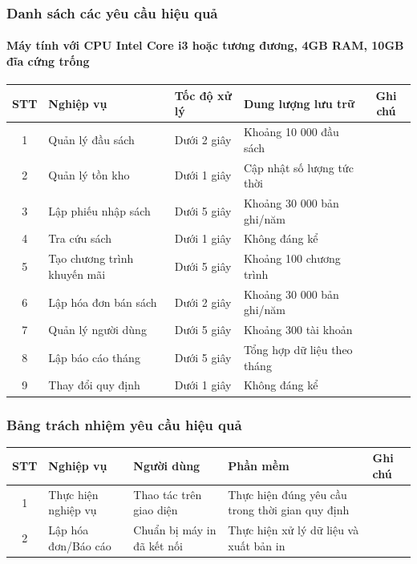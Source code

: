 \documentclass[12pt]{report}
\begin{document}
            \subsubsection{Danh sách các yêu cầu hiệu quả}
                \paragraph{Máy tính với CPU Intel Core i3 hoặc tương đương, 4GB RAM, 10GB đĩa cứng trống}
                \begin{tabularx}{\textwidth}{|c|>{\RaggedRight}X|l|l|c|}
                    \hline
                    \textbf{STT} & \textbf{Nghiệp vụ} & 
                    \textbf{Tốc độ xử lý} & \textbf{Dung lượng lưu trữ} & \textbf{Ghi chú} \\ \hline
                    1 & Quản lý đầu sách & Dưới 2 giây & Khoảng 10 000 đầu sách & \\ \hline
                    2 & Quản lý tồn kho & Dưới 1 giây & Cập nhật số lượng tức thời & \\ \hline
                    3 & Lập phiếu nhập sách & Dưới 5 giây & Khoảng 30 000 bản ghi/năm & \\ \hline
                    4 & Tra cứu sách & Dưới 1 giây & Không đáng kể & \\ \hline
                    5 & Tạo chương trình khuyến mãi & Dưới 5 giây & Khoảng 100 chương trình & \\ \hline
                    6 & Lập hóa đơn bán sách & Dưới 2 giây & Khoảng 30 000 bản ghi/năm & \\ \hline
                    7 & Quản lý người dùng & Dưới 5 giây & Khoảng 300 tài khoản & \\ \hline
                    8 & Lập báo cáo tháng & Dưới 5 giây & Tổng hợp dữ liệu theo tháng & \\ \hline
                    9 & Thay đổi quy định & Dưới 1 giây & Không đáng kể & \\ \hline
                \end{tabularx}
            \subsubsection{Bảng trách nhiệm yêu cầu hiệu quả}
                \begin{tabularx}{\textwidth}{|c|>{\RaggedRight}X|>{\RaggedRight}X|>{\RaggedRight}X|l|}
                    \hline
                    \textbf{STT} & \textbf{Nghiệp vụ} & 
                    \textbf{Người dùng} & \textbf{Phần mềm} & 
                    \textbf{Ghi chú} \\ \hline
                    1 & Thực hiện nghiệp vụ & Thao tác trên giao diện & Thực hiện đúng yêu cầu trong thời gian quy định & \\ \hline
                    2 & Lập hóa đơn/Báo cáo & Chuẩn bị máy in đã kết nối & Thực hiện xử lý dữ liệu và xuất bản in & \\ \hline
                \end{tabularx}
\end{document}
